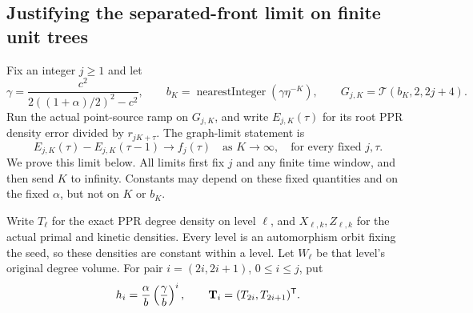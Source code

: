 \subsection{Justifying the separated-front limit on finite unit trees}
Fix an integer $j\geq1$ and let
\[
 \gamma=\frac{c^2}{2((1+\alpha)/2)^2-c^2},\qquad
 b_K=\operatorname{nearestInteger}(\gamma\eta^{-K}),
 \qquad G_{j,K}=\mathcal T(b_K,2,2j+4).
\]
Run the actual point-source ramp on $G_{j,K}$, and write $E_{j,K}(\tau)$
for its root PPR density error divided by $r_{jK+\tau}$.
The graph-limit statement is
\begin{equation}
 E_{j,K}(\tau)-E_{j,K}(\tau-1)\longrightarrow f_j(\tau)
 \quad\text{as }K\to\infty,
 \quad\text{for every fixed }j,\tau.
 \tag{FL}\label{eq:revisit-front-limit}
\end{equation}
We prove this limit below. All limits first fix $j$ and any finite time
window, and then send $K$ to infinity. Constants may depend on these fixed
quantities and on the fixed $\alpha$, but not on $K$ or $b_K$.

Write $T_\ell$ for the exact PPR degree density on level $\ell$, and
$X_{\ell,k},Z_{\ell,k}$ for the actual primal and kinetic densities.
Every level is an automorphism orbit fixing the seed, so these densities
are constant within a level. Let $W_\ell$ be that level's original degree
volume. For pair $i=(2i,2i+1)$, $0\leq i\leq j$, put
\[
 h_i=\frac\alpha b\left(\frac\gamma b\right)^i,
 \qquad \mathbf T_i=(T_{2i},T_{2i+1})^{\mathsf{T}}.
\]

